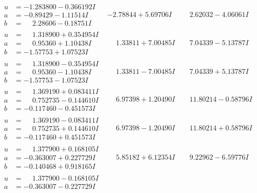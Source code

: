 \documentclass[1p]{elsarticle_modified}
\theoremstyle{definition}
\begin{document}
$$\begin{array}{c|c|c}
\begin{aligned}
u &= -1.283800 - 0.366192 I \\
a &= -0.89429 - 1.11514 I \\
b &= \phantom{-}2.28606 - 0.18751 I\end{aligned}
 & -2.78844 + 5.69706 I & \phantom{-}2.62032 - 4.06061 I \\ \hline\begin{aligned}
u &= \phantom{-}1.318900 + 0.354954 I \\
a &= \phantom{-}0.95360 + 1.10438 I \\
b &= -1.57753 + 1.07523 I\end{aligned}
 & \phantom{-}1.33811 + 7.00485 I & \phantom{-}7.04339 - 5.13787 I \\ \hline\begin{aligned}
u &= \phantom{-}1.318900 - 0.354954 I \\
a &= \phantom{-}0.95360 - 1.10438 I \\
b &= -1.57753 - 1.07523 I\end{aligned}
 & \phantom{-}1.33811 - 7.00485 I & \phantom{-}7.04339 + 5.13787 I \\ \hline\begin{aligned}
u &= \phantom{-}1.369190 + 0.083411 I \\
a &= \phantom{-}0.752735 - 0.144610 I \\
b &= -0.117460 - 0.451573 I\end{aligned}
 & \phantom{-}6.97398 + 1.20490 I & \phantom{-}11.80214 - 0.58796 I \\ \hline\begin{aligned}
u &= \phantom{-}1.369190 - 0.083411 I \\
a &= \phantom{-}0.752735 + 0.144610 I \\
b &= -0.117460 + 0.451573 I\end{aligned}
 & \phantom{-}6.97398 - 1.20490 I & \phantom{-}11.80214 + 0.58796 I \\ \hline\begin{aligned}
u &= \phantom{-}1.377900 + 0.168105 I \\
a &= -0.363007 + 0.227729 I \\
b &= -0.140468 + 0.918165 I\end{aligned}
 & \phantom{-}5.85182 + 6.12354 I & \phantom{-}9.22962 - 6.59776 I \\ \hline\begin{aligned}
u &= \phantom{-}1.377900 - 0.168105 I \\
a &= -0.363007 - 0.227729 I \\

\end{aligned}
\end{array}$$
\end{document}
